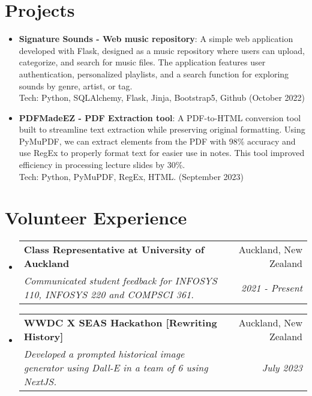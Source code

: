 \documentclass[a4paper,20pt]{article}
\makeatletter
\newcommand{\resumeItem}[2]{
  \item\small{
    \textbf{#1}{: #2 \vspace{-2pt}}
  }
}
\newcommand{\resumeSubheading}[4]{
  \vspace{-1pt}\item
    \begin{tabular*}{0.97\textwidth}{l@{\extracolsep{\fill}}r}
      \textbf{#1} & #2 \\
      \textit{#3} & \textit{#4} \\
    \end{tabular*}\vspace{-5pt}
}
\newcommand{\resumeSubItem}[2]{\resumeItem{#1}{#2}\vspace{-3pt}}
\newcommand{\resumeSubHeadingListStart}{\begin{itemize}[leftmargin=*]}
\newcommand{\resumeSubHeadingListEnd}{\end{itemize}}
\makeatother
\begin{document}
\section{Projects}
\resumeSubHeadingListStart
\resumeSubItem{Signature Sounds - Web music repository}{ A simple web application developed with Flask, designed as a music repository where users can upload, categorize, and search for music files. The application features user authentication, personalized playlists, and a search function for exploring sounds by genre, artist, or tag. \\Tech: Python, SQLAlchemy, Flask, Jinja, Bootstrap5, Github (October 2022)}
\vspace{2pt}
\resumeSubItem{PDFMadeEZ - PDF Extraction tool}{A PDF-to-HTML conversion tool built to streamline text extraction while preserving original formatting. Using PyMuPDF, we can extract elements from the PDF with 98\% accuracy and use RegEx to properly format text for easier use in notes. This tool improved efficiency in processing lecture slides by 30\%.\\
Tech: Python, PyMuPDF, RegEx, HTML. (September 2023)}

\resumeSubHeadingListEnd
\vspace{-5pt}
\section{Volunteer Experience}
  \resumeSubHeadingListStart
	\resumeSubheading
    {Class Representative at University of Auckland}{Auckland, New Zealand}
    {Communicated student feedback for INFOSYS 110, INFOSYS 220 and COMPSCI 361.}
    { 2021 - Present}
    \resumeSubheading
    {WWDC X SEAS Hackathon [Rewriting History] }{Auckland, New Zealand}
    {Developed a prompted historical image generator using Dall-E in a team of 6 using NextJS.  }{July 2023}

\resumeSubHeadingListEnd
\end{document}
